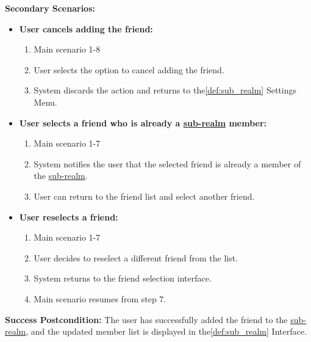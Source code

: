 \documentclass{article}
\begin{document}
\begin{enumerate}[label=\textbf{UC\arabic*}]
          \textbf{Secondary Scenarios:}
          \begin{itemize}
              \item[{}] \textbf{User cancels adding the friend:}
                    \begin{enumerate}[label=\textbf{\arabic*.}]
                        \item Main scenario 1-8
                        \item User selects the option to cancel adding the friend.
                        \item System discards the action and returns to the\ref{def:sub_realm} Settings Menu.
                    \end{enumerate}

              \item[{}] \textbf{User selects a friend who is already a \hyperref[def:sub_realm]{sub-realm} member:}
                    \begin{enumerate}[label=\textbf{\arabic*.}]
                        \item Main scenario 1-7
                        \item System notifies the user that the selected friend is already a member of the \hyperref[def:sub_realm]{sub-realm}.
                        \item User can return to the friend list and select another friend.
                    \end{enumerate}

              \item[{}] \textbf{User reselects a friend:}
                    \begin{enumerate}[label=\textbf{\arabic*.}]
                        \item Main scenario 1-7
                        \item User decides to reselect a different friend from the list.
                        \item System returns to the friend selection interface.
                        \item Main scenario resumes from step 7.
                    \end{enumerate}
          \end{itemize}

          \textbf{Success Postcondition:} The user has successfully added the friend to the \hyperref[def:sub_realm]{sub-realm}, and the updated member list is displayed in the\ref{def:sub_realm} Interface.


\end{enumerate}
\end{document}
